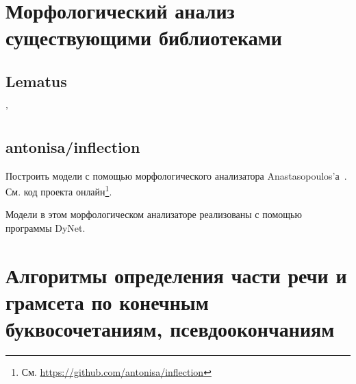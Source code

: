\section{Морфологический анализ существующими библиотеками} \label{sect_exp_libs}



\subsection{Lematus} \label{sect_exp_lematus}'




\subsection{antonisa/inflection}

Построить модели с помощью морфологического анализатора 
Anastasopoulos'а~\cite{Anastasopoulos2019Pushing_Limits_Low-Resource_MI}.
См. код проекта онлайн\footnote{См. \url{https://github.com/antonisa/inflection}}. 

Модели в этом морфологическом анализаторе реализованы с помощью программы DyNet. 

\section{Алгоритмы определения части речи и грамсета по конечным буквосочетаниям, псевдоокончаниям} \label{sect_exp_alg_end}


